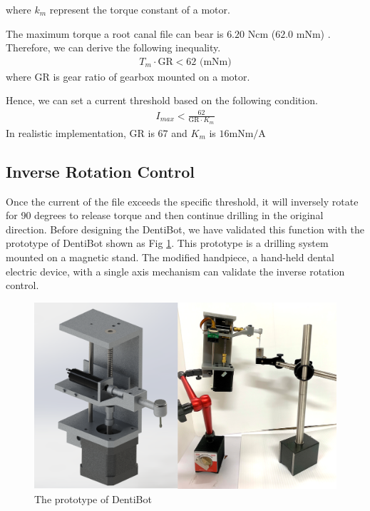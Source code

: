 where $k_m$ represent the torque constant of a motor.
\par\noindent
The maximum torque a root canal file can bear is $6.20$ Ncm ($62.0$ mNm) \cite{boessler2009effect}. Therefore, we can derive the following inequality.
\begin{equation}
\begin{split}
T_m \cdot \mathrm{GR} < 62 \text{ (mNm)}
\end{split}
\end{equation}
where $\mathrm{GR}$ is gear ratio of gearbox mounted on a motor.
\par
Hence, we can set a current threshold based on the following condition. 
\begin{equation}
\begin{split}
I_{max} < \frac{62}{\mathrm{GR} \cdot K_m}
\end{split}
\end{equation} 
In realistic implementation, $\mathrm{GR}$ is $67$ and $K_m$ is $16 \text{mNm/A}$
\subsection{Inverse Rotation Control}
\label{sec:Inverse Rotation Control}
\hspace*{6mm}Once the current of the file exceeds the specific threshold, it will inversely rotate for 90 degrees to release torque and then continue drilling in the original direction. Before designing the DentiBot, we have validated this function with the prototype of DentiBot shown as Fig \ref{fig: prototype}. This prototype is a drilling system mounted on a magnetic stand. The modified handpiece, a hand-held dental electric device, with a single axis mechanism can validate the inverse rotation control. 
\begin{figure}[htbp]
\begin{center}
\includegraphics[width=1\linewidth]{Images/Prototype.png}
\caption{The prototype of DentiBot}
\label{fig: prototype}
\end{center}
\end{figure}	

